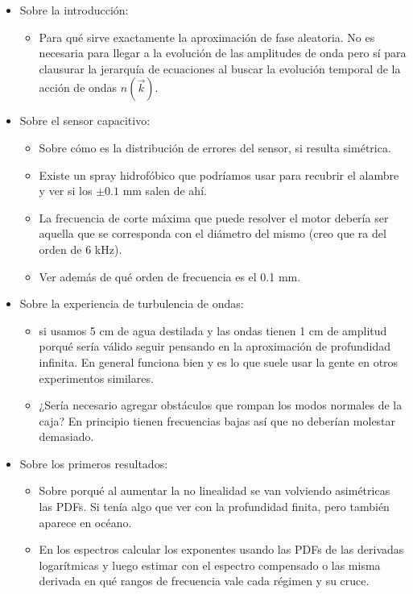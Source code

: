 \begin{itemize} 
	\item Sobre la introducción: 
	\begin{itemize} 
		\item Para qué sirve exactamente la aproximación  de fase aleatoria. No es necesaria para llegar a la evolución de las amplitudes de onda pero sí para clausurar la jerarquía de ecuaciones al buscar la evolución temporal de la acción de ondas $n(\vec k)$. 
	\end{itemize}
	\item Sobre el sensor capacitivo: 
	\begin{itemize}
		\item Sobre cómo es la distribución de errores del sensor, si resulta simétrica. 
		\item Existe un spray hidrofóbico que podríamos usar para recubrir el alambre y ver si los $\pm0.1$ mm salen de ahí. 
		\item La frecuencia de corte máxima que puede resolver el motor debería ser aquella que se corresponda con el diámetro del mismo (creo que ra del orden de $6$ kHz). 
		\item Ver además de qué orden de frecuencia es el 0.1 mm. 
	\end{itemize} 
	\item Sobre la experiencia de turbulencia de ondas: 
	\begin{itemize}		
		\item si usamos 5 cm de agua destilada y las ondas tienen 1 cm de amplitud porqué sería válido seguir pensando en la aproximación de profundidad infinita. En general funciona bien y es lo que suele usar la gente en otros experimentos similares. 
		\item ¿Sería necesario agregar obstáculos que rompan los modos normales de la caja? En principio tienen frecuencias bajas así que no deberían molestar demasiado. 
	\end{itemize}	
	\item Sobre los primeros resultados: 
	\begin{itemize}
		\item Sobre porqué al aumentar la no linealidad se van volviendo asimétricas las PDFs. Si tenía algo que ver con la profundidad finita, pero también aparece en océano.  
		\item En los espectros calcular los exponentes usando las PDFs de las derivadas logarítmicas y luego estimar con el espectro compensado o las misma derivada en qué rangos de frecuencia vale cada régimen y su cruce. 

\end{itemize}
\end{itemize}

